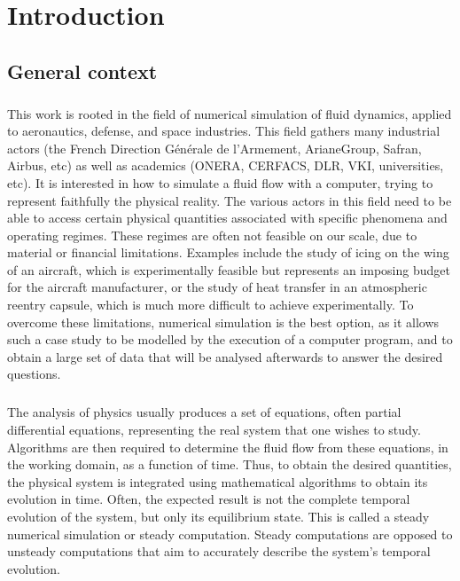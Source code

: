 \chapter*{Introduction}


  \section*{General context}

    \paragraph{}
    This work is rooted in the field of numerical simulation of fluid dynamics, applied to aeronautics, defense, and space industries.
    This field gathers many industrial actors (the French Direction Générale de l'Armement, ArianeGroup, Safran, Airbus, etc) as well as academics (ONERA, CERFACS, DLR, VKI, universities, etc).
    It is interested in how to simulate a fluid flow with a computer, trying to represent faithfully the physical reality.
    The various actors in this field need to be able to access certain physical quantities associated with specific phenomena and operating regimes.
    These regimes are often not feasible on our scale, due to material or financial limitations.
    Examples include the study of icing on the wing of an aircraft, which is experimentally feasible but represents an imposing budget for the aircraft manufacturer, or the study of heat transfer in an atmospheric reentry capsule, which is much more difficult to achieve experimentally.
    To overcome these limitations, numerical simulation is the best option, as it allows such a case study to be modelled by the execution of a computer program, and to obtain a large set of data that will be analysed afterwards to answer the desired questions.

    \paragraph{}
    The analysis of physics usually produces a set of equations, often partial differential equations, representing the real system that one wishes to study.
    Algorithms are then required to determine the fluid flow from these equations, in the working domain, as a function of time.
    Thus, to obtain the desired quantities, the physical system is integrated using mathematical algorithms to obtain its evolution in time.
    Often, the expected result is not the complete temporal evolution of the system, but only its equilibrium state.
    This is called a steady numerical simulation or steady computation.
    Steady computations are opposed to unsteady computations that aim to accurately describe the system's temporal evolution.

